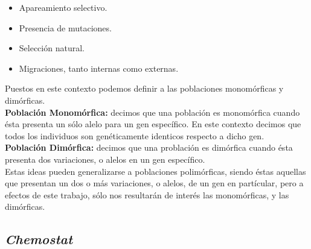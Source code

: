 \documentclass[letterpaper]{article}
\begin{document}
{{\begin{itemize}
                \item {

                    \normalsize{Apareamiento selectivo.}
                
                }

                \item {

                    \normalsize{Presencia de mutaciones.}
                
                }

                \item {

                    \normalsize{Selección natural.}
                
                }
                
                \item {

                    \normalsize{Migraciones, tanto internas como externas.}
                
                }
            \end{itemize}

            \normalsize{Puestos en este contexto podemos definir a las poblaciones monomórficas y dimórficas.}\\

            \normalsize{\textbf{Población Monomórfica:} decimos que una población es monomórfica cuando ésta presenta un sólo alelo para un gen específico. En este contexto decimos que todos los individuos son genéticamente identicos respecto a dicho gen.}\\

            \normalsize{\textbf{Población Dimórfica:} decimos que una problación es dimórfica cuando ésta presenta dos variaciones, o alelos en un gen específico.}\\

            \normalsize{Estas ideas pueden generalizarse a poblaciones polimórficas, siendo éstas aquellas que presentan un dos o más variaciones, o alelos, de un gen en partícular, pero a efectos de este trabajo, sólo nos resultarán de interés las monomórficas, y las dimórficas.}
        
        }

        \subsection{\textit{Chemostat}}{

}}
\end{document}
